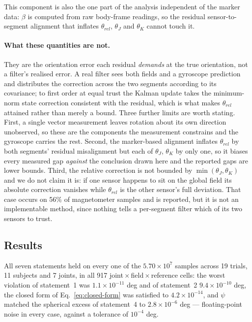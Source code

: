 This component is also the one part of the analysis independent of the marker data: $\beta$ is
computed from raw body-frame readings, so the residual sensor-to-segment alignment that inflates
$\theta_{rel}$, $\theta_J$ and $\theta_K$ cannot touch it.

\paragraph{What these quantities are not.}
They are the orientation error each residual \emph{demands} at the true orientation, not a
filter's realised error. A real filter sees both fields and a gyroscope prediction and
distributes the correction across the two segments according to its covariance; to first order at
equal trust the Kalman update takes the minimum-norm state correction consistent with the
residual, which is what makes $\theta_{rel}$ attained rather than merely a bound. Three further
limits are worth stating. First, a single vector measurement leaves rotation about its own
direction unobserved, so these are the components the measurement constrains and the gyroscope
carries the rest. Second, the marker-based alignment inflates $\theta_{rel}$ by both segments'
residual misalignment but each of $\theta_J$, $\theta_K$ by only one, so it biases every measured
gap \emph{against} the conclusion drawn here and the reported gaps are lower bounds. Third, the
relative correction is not bounded by $\min(\theta_J, \theta_K)$ and we do not claim it is: if
one sensor happens to sit on the global field its absolute correction vanishes while
$\theta_{rel}$ is the other sensor's full deviation. That case occurs on 56\% of magnetometer
samples and is reported, but it is not an implementable method, since nothing tells a
per-segment filter which of its two sensors to trust.

\subsection{Results}
\label{sec:relative-results}

All seven statements held on every one of the $5.70\times10^{7}$ samples across 19 trials, 11
subjects and 7 joints, in all 917 joint\,$\times$\,field\,$\times$\,reference cells: the worst
violation of statement~1 was $1.1\times10^{-11}$ deg and of statement~2 $9.4\times10^{-10}$ deg,
the closed form of Eq.~\eqref{eq:closed-form} was satisfied to $4.2\times10^{-14}$, and $\psi$
matched the spherical excess of statement~4 to $2.8\times10^{-6}$ deg --- floating-point noise in
every case, against a tolerance of $10^{-4}$ deg.

